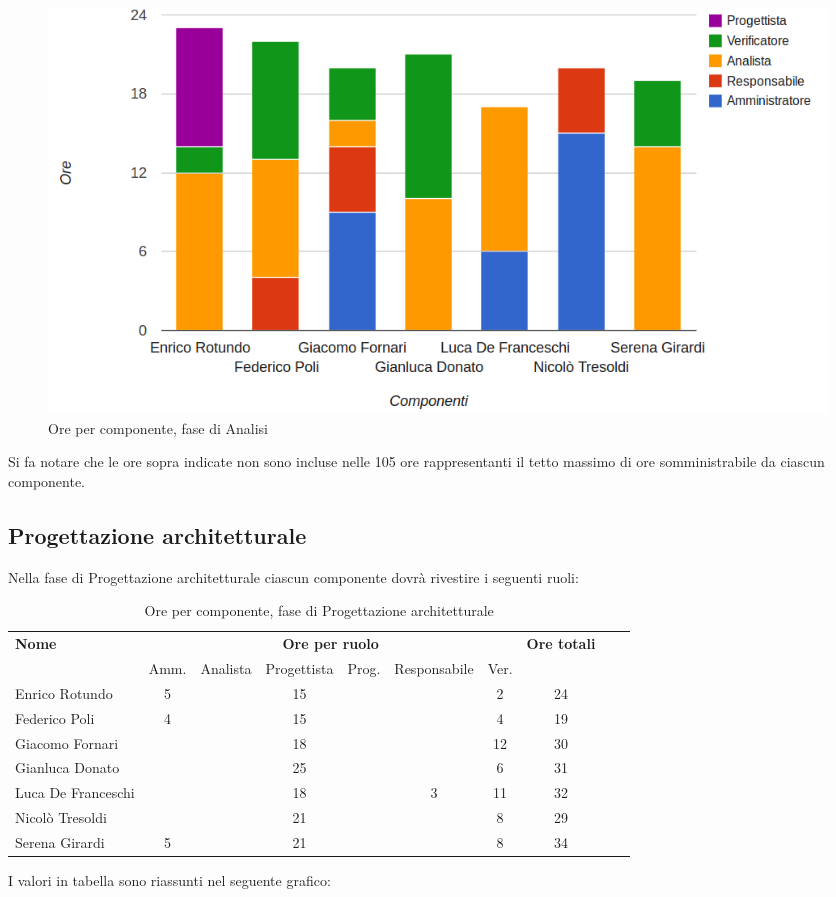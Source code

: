 \begin{figure}[H]
\centering
\includegraphics[scale=0.35]{4-1.png}
\caption{Ore per componente, fase di Analisi\label{fig:nome}}
\end{figure}

Si fa notare che le ore sopra indicate non sono incluse nelle 105 ore rappresentanti il tetto massimo di ore somministrabile da ciascun componente.

\subsection{Progettazione architetturale}

Nella fase di Progettazione architetturale ciascun componente dovrà rivestire i seguenti ruoli:

\begin{table}[H]
\centering
\begin{tabular}{lccccccccc}
\toprule 
    \textbf{Nome}  & \multicolumn{6}{c}{\textbf{Ore per ruolo}} & \textbf{Ore totali} \\
    & Amm. & Analista & Progettista & Prog. & Responsabile & Ver. \\
    \midrule
    Enrico Rotundo   	& 5 &  &	 15	& &   &	2 &	24 \\
    Federico Poli  		& 4	&  &	 15	& &   & 4 & 19 \\
    Giacomo Fornari		& 	&  &	 18	& &   &	12 & 30 \\
    Gianluca Donato 		& 	&  &	 25	& &   &	6 & 31 \\
    Luca De Franceschi 	& 	&  &	 18	& & 3 &	11 & 32 \\
    Nicolò Tresoldi 		& 	&  &	 21	& &   & 8 & 29 \\
   	Serena Girardi 		& 5	&  &	 21	& &   &	8 & 34 \\
    
    \bottomrule
\end{tabular}
\caption{Ore per componente, fase di Progettazione architetturale}
\end{table}
I valori in tabella sono riassunti nel seguente grafico: \\ \\ \\


